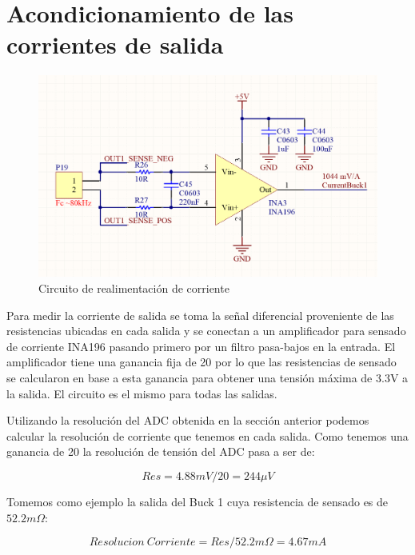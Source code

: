 \documentclass[12pt]{report}
\begin{document}
\section{Acondicionamiento de las corrientes de salida}

\begin{figure}[H]
	\centering
	\includegraphics[width=\textwidth,height=\textheight,keepaspectratio]{current_feedback}
	\caption{Circuito de realimentación de corriente}
\end{figure}

Para medir la corriente de salida se toma la señal diferencial proveniente de las resistencias ubicadas en cada salida y se conectan a un amplificador para sensado de corriente INA196 pasando primero por un filtro pasa-bajos en la entrada. El amplificador tiene una ganancia fija de 20 por lo que las resistencias de sensado se calcularon en base a esta ganancia para obtener una tensión máxima de 3.3V a la salida. El circuito es el mismo para todas las salidas.

Utilizando la resolución del ADC obtenida en la sección anterior podemos calcular la resolución de corriente que tenemos en cada salida. Como tenemos una ganancia de 20 la resolución de tensión del ADC pasa a ser de:

\begin{equation}
	Res = 4.88mV / 20 = 244\mu V
\end{equation}

Tomemos como ejemplo la salida del Buck 1 cuya resistencia de sensado es de $52.2m\Omega$:

\begin{equation}
	Resolucion \ Corriente = Res / 52.2m\Omega = 4.67mA
\end{equation}
\end{document}
